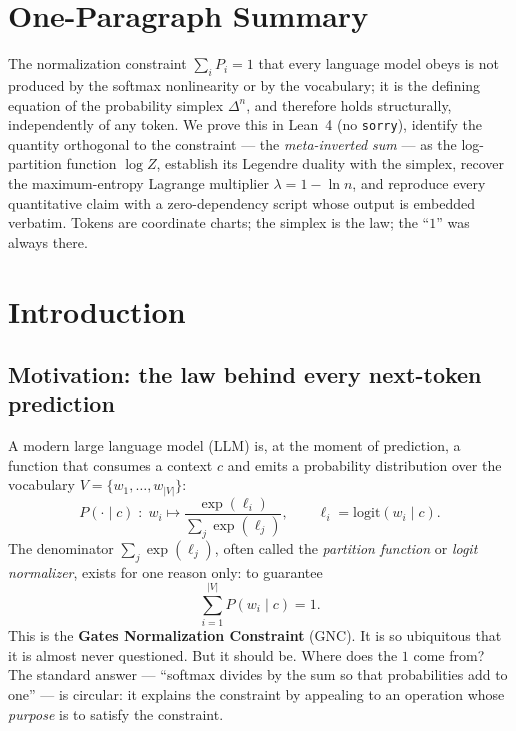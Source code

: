 \documentclass[11pt]{article}
\newcommand{\simplex}[1]{\Delta^{#1}}
\begin{document}
\cleardoublepage

\tableofcontents
\newpage

\section*{One-Paragraph Summary}
The normalization constraint $\sum_i P_i=1$ that every language model obeys is
not produced by the softmax nonlinearity or by the vocabulary; it is the defining
equation of the probability simplex $\simplex{n}$, and therefore holds
structurally, independently of any token. We prove this in Lean~4 (no
\texttt{sorry}), identify the quantity orthogonal to the constraint --- the
\emph{meta-inverted sum} --- as the log-partition function $\log Z$, establish
its Legendre duality with the simplex, recover the maximum-entropy Lagrange
multiplier $\lambda=1-\ln n$, and reproduce every quantitative claim with a
zero-dependency script whose output is embedded verbatim. Tokens are coordinate
charts; the simplex is the law; the ``$1$'' was always there.

\newpage

\section{Introduction}
\label{sec:intro}

\subsection{Motivation: the law behind every next-token prediction}
\label{sec:motivation}

A modern large language model (LLM) is, at the moment of prediction, a function
that consumes a context $c$ and emits a probability distribution over the
vocabulary $V = \{w_1,\dots,w_{|V|}\}$:
\begin{equation}
P(\cdot\mid c)\;:\; w_i \longmapsto \frac{\exp(\ell_i)}{\sum_j \exp(\ell_j)},
\qquad \ell_i = \mathrm{logit}(w_i\mid c).
\end{equation}
The denominator $\sum_j \exp(\ell_j)$, often called the \emph{partition
function} or \emph{logit normalizer}, exists for one reason only: to guarantee
\begin{equation}
\sum_{i=1}^{|V|} P(w_i\mid c) = 1.
\end{equation}
This is the \textbf{Gates Normalization Constraint} (GNC). It is so ubiquitous
that it is almost never questioned. But it should be. Where does the $1$ come
from? The standard answer --- ``softmax divides by the sum so that probabilities
add to one'' --- is circular: it explains the constraint by appealing to an
operation whose \emph{purpose} is to satisfy the constraint.
\end{document}
